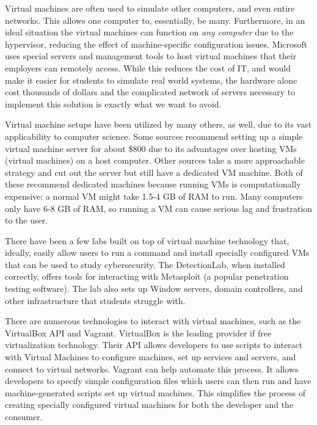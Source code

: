 \documentclass[openright]{report}
\begin{document}
\par Virtual machines are often used to simulate other computers, and even entire networks. This allows one computer to, essentially, be many. Furthermore, in an ideal situation the virtual machines can function on \textit{any computer} due to the hypervisor, reducing the effect of machine-specific configuration issues. Microsoft uses special servers and management tools to host virtual machines that their employers can remotely access\cite{ms_virtual_setup}. While this reduces the cost of IT, and would make it easier for students to simulate real world systems, the hardware alone cost thousands of dollars and the complicated network of servers necessary to implement this solution is exactly what we want to avoid.

\par Virtual machine setups have been utilized by many others, as well, due to its vast applicability to computer science. Some sources recommend setting up a simple virtual machine server for about \$800 due to its advantages over hosting VMs (virtual machines) on a host computer\cite{virtual_mch_server}. Other sources take a more approachable strategy and cut out the server but still have a dedicated VM machine\cite{simple_virtual}. Both of these recommend dedicated machines because running VMs is computationally expensive: a normal VM might take 1.5-4 GB of RAM to run. Many computers only have 6-8 GB of RAM, so running a VM can cause serious lag and frustration to the user. 

\par There have been a few labs built on top of virtual machine technology that, ideally, easily allow users to run a command and install specially configured VMs that can be used to study cybersecurity. The DetectionLab, when installed correctly, offers tools for interacting with Metasploit (a popular penetration testing software). The lab also sets up Window servers, domain controllers, and other infrastructure that students struggle with\cite{detection_lab}.

\par There are numerous technologies to interact with virtual machines, such as the VirtualBox API and Vagrant. VirtualBox is the leading provider if free virtualization technology. Their API allows developers to use scripts to interact with Virtual Machines to configure machines, set up services and servers, and connect to virtual networks\cite{vb_api}. Vagrant can help automate this process. It allows developers to specify simple configuration files which users can then run and have machine-generated scripts set up  virtual machines\cite{vagrant}. This simplifies the process of creating specially configured virtual machines for both the developer and the consumer.
\end{document}
